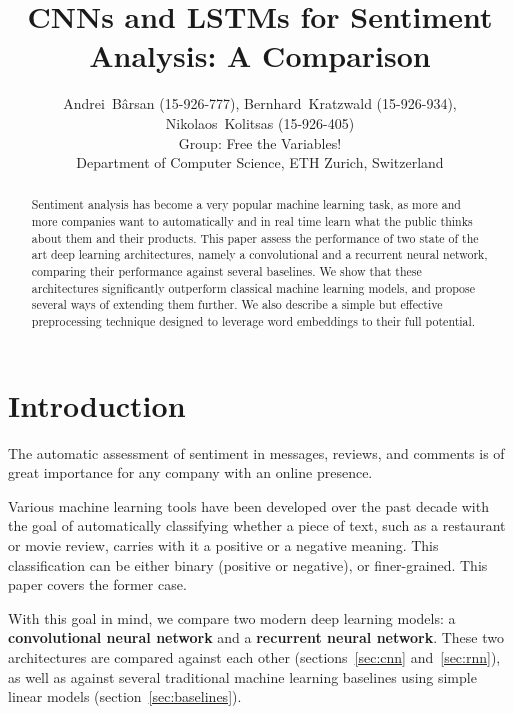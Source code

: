 \documentclass[10pt,conference,compsocconf]{IEEEtran}
\begin{document}
\title{CNNs and LSTMs for Sentiment Analysis: A Comparison}

\author{
  Andrei~Bârsan (15-926-777), Bernhard~Kratzwald (15-926-934), Nikolaos~Kolitsas (15-926-405)\\
  Group: Free the Variables!\\
  Department of Computer Science, ETH Zurich, Switzerland
}

\maketitle

\begin{abstract}
	Sentiment analysis has become a very popular machine learning task, as
    more and more companies want to automatically and in real time learn
    what the public thinks about them and their products.
    This paper assess the performance of two state of the art deep learning
    architectures, namely a convolutional and a recurrent neural network,
    comparing their performance against several baselines.
    We show that these architectures significantly outperform classical
    machine learning models, and propose several ways of extending them
    further.
    We also describe a simple but effective preprocessing technique designed
    to leverage word embeddings to their full potential.
\end{abstract}

\section{Introduction}
\label{sec:introduction}

The automatic assessment of sentiment in messages, reviews, and comments
is of great importance for any company with an online presence.

Various machine learning tools have been developed over the past decade with
the goal of automatically classifying whether a piece of text, such as a
restaurant or movie review, carries with it a positive or a negative meaning.
This classification can be either binary (positive or negative), or 
finer-grained. This paper covers the former case.

With this goal in mind, we compare two modern deep learning
models:
a \textbf{convolutional neural network} and
a \textbf{recurrent neural network}. These two
architectures are compared against each other (sections~\ref{sec:cnn} 
and~\ref{sec:rnn}), as well as against several 
traditional machine learning baselines using simple linear models
(section~\ref{sec:baselines}).
\end{document}
